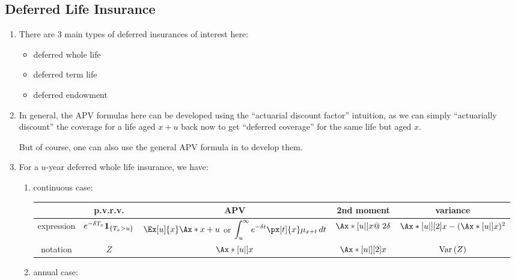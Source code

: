 \subsection{Deferred Life Insurance}
\label{subsect:defer-insurance}
\begin{enumerate}
\item There are 3 main types of deferred insurances of interest here:
\begin{itemize}
\item deferred whole life
\item deferred term life
\item deferred endowment
\end{itemize}
\item In general, the APV formulas here can be developed using the ``actuarial
discount factor'' intuition, as we can simply ``actuarially discount'' the
coverage for a life aged \(x+u\) back now to get ``deferred coverage'' for the
same life but aged \(x\).


But of course, one can also use the general APV formula in  to develop them.
\item For a \(u\)-year deferred whole life insurance, we have:
\begin{enumerate}
\item continuous case:
\label{it:deferred-cts-whole-life-fmlas}

\begin{tabular}{ccccc}
\toprule
&p.v.r.v.&APV&2nd moment&variance\\
\midrule
expression&\(e^{-\delta T_x}\mathbf{1}_{\left\{T_x>u\right\}}\)
&\(\Ex[u]{x}\Ax*{x+u}\) or \(\displaystyle\int_{u}^{\infty}e^{-\delta t}\px[t]{x}\mu_{x+t}\,dt\)
&\(\Ax*[u|]{x}@\;2\delta\)&\(\Ax*[u|][2]{x}-(\Ax*[u|]{x})^2\)\\
notation&\(Z\)&\(\Ax*[u|]{x}\)&\(\Ax*[u|][2]{x}\)&\(\operatorname{Var}\qty(Z)\)\\
\bottomrule
\end{tabular}
\item annual case:
\label{it:deferred-annual-whole-life-fmlas}


\end{enumerate}
\end{enumerate}
